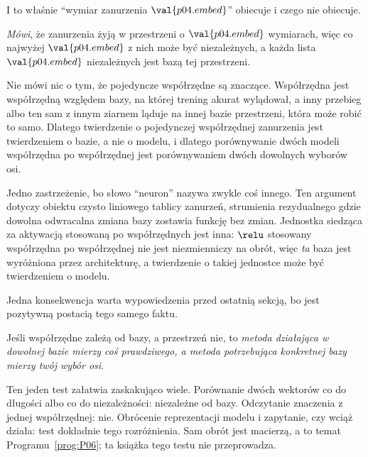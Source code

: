 \begin{fr}
\begin{aibox}
I to właśnie \enquote{wymiar zanurzenia $\val{p04.embed}$} obiecuje i czego nie
obiecuje.

\emph{Mówi}, że zanurzenia żyją w przestrzeni o $\val{p04.embed}$ wymiarach,
więc co najwyżej $\val{p04.embed}$ z nich może być niezależnych, a każda lista
$\val{p04.embed}$ niezależnych jest bazą tej przestrzeni.

Nie mówi nic o tym, że pojedyncze współrzędne są znaczące. Współrzędna jest
współrzędną względem bazy, na której trening akurat wylądował, a inny przebieg
\dash{} albo ten sam z innym ziarnem \dash{} ląduje na innej bazie przestrzeni,
która może robić to samo. Dlatego twierdzenie o pojedynczej współrzędnej
zanurzenia jest twierdzeniem o bazie, a nie o modelu, i dlatego porównywanie
dwóch modeli współrzędna po współrzędnej jest porównywaniem dwóch dowolnych
wyborów osi.

Jedno zastrzeżenie, bo słowo \enquote{neuron} nazywa zwykle coś innego. Ten
argument dotyczy obiektu czysto liniowego \dash{} tablicy zanurzeń, strumienia
rezydualnego \dash{} gdzie dowolna odwracalna zmiana bazy zostawia funkcję bez
zmian. Jednostka siedząca za aktywacją stosowaną po współrzędnych jest inna:
$\relu$ stosowany współrzędna po współrzędnej nie jest niezmienniczy na obrót,
więc \emph{ta} baza jest wyróżniona przez architekturę, a twierdzenie o takiej
jednostce może być twierdzeniem o modelu.
\end{aibox}
\end{fr}

\begin{fr}
Jedna konsekwencja warta wypowiedzenia przed ostatnią sekcją, bo jest
pozytywną postacią tego samego faktu.

Jeśli współrzędne zależą od bazy, a przestrzeń nie, to \emph{metoda działająca
w dowolnej bazie mierzy coś prawdziwego, a metoda potrzebująca konkretnej bazy
mierzy twój wybór osi}.

Ten jeden test załatwia zaskakująco wiele. Porównanie dwóch wektorów co do
długości albo co do niezależności: niezależne od bazy. Odczytanie znaczenia z
jednej współrzędnej: nie. Obrócenie reprezentacji modelu i zapytanie, czy wciąż
działa: test dokładnie tego rozróżnienia. Sam obrót jest macierzą, a to
temat Programu~\ref{prog:P06}; ta książka tego testu nie przeprowadza.
\end{fr}

